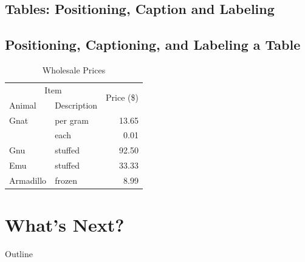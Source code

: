 \documentclass[usenames,dvipsnames]{beamer}
\begin{document}
\subsection{Tables: Positioning, Caption and Labeling}
\begin{frame}[fragile]{\insertsubsection}
\begin{itemize}





 \section{Positioning, Captioning, and Labeling a Table}

\begin{table}[b]
\centering
\begin{tabular}{|l|l|r|} \hline
  \multicolumn{2}{|c|}{Item} & \multirow{2}{*}{Price (\$)}\\ \cline{1-2}
  Animal & Description &  \\ \hline
  Gnat  & per gram & 13.65 \\
        & each     &  0.01 \\
  Gnu   & stuffed  & 92.50 \\
  Emu   & stuffed  & 33.33 \\
  Armadillo & frozen & 8.99 \\ \hline
 \end{tabular}
 \caption{\label{tab:prices}Wholesale Prices}
 \end{table}
  


\end{itemize}
\end{frame}


\section{What's Next?}


\begin{frame}{Outline}
\begin{multicols}{2}
\tableofcontents[currentsection]
\end{multicols}
\end{frame}

\end{document}
